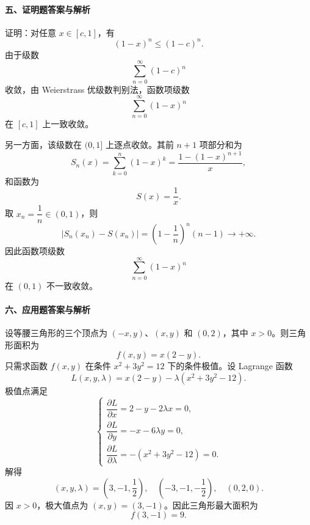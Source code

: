 \paragraph*{五、证明题答案与解析}
证明：对任意 $x\in[c,1]$，有
\[
  (1-x)^n\le (1-c)^n.
\]
由于级数
\[
  \sum_{n=0}^{\infty}(1-c)^n
\]
收敛，由 Weierstrass 优级数判别法，函数项级数
\[
  \sum_{n=0}^{\infty}(1-x)^n
\]
在 $[c,1]$ 上一致收敛。

另一方面，该级数在 $(0,1]$ 上逐点收敛。其前 $n+1$ 项部分和为
\[
  S_n(x)=\sum_{k=0}^{n}(1-x)^k
  =\frac{1-(1-x)^{n+1}}{x},
\]
和函数为
\[
  S(x)=\frac1x.
\]
取 $x_n=\dfrac1n\in(0,1)$，则
\[
  \left|S_n(x_n)-S(x_n)\right|
  =\left(1-\frac1n\right)^n(n-1)\to+\infty.
\]
因此函数项级数
\[
  \sum_{n=0}^{\infty}(1-x)^n
\]
在 $(0,1)$ 不一致收敛。

\paragraph*{六、应用题答案与解析}
设等腰三角形的三个顶点为 $(-x,y)$、$(x,y)$ 和 $(0,2)$，其中 $x>0$。则三角形面积为
\[
  f(x,y)=x(2-y).
\]
只需求函数 $f(x,y)$ 在条件 $x^2+3y^2=12$ 下的条件极值。设 Lagrange 函数
\[
  L(x,y,\lambda)=x(2-y)-\lambda(x^2+3y^2-12).
\]
极值点满足
\[
  \begin{cases}
    \dfrac{\partial L}{\partial x}=2-y-2\lambda x=0,\\
    \dfrac{\partial L}{\partial y}=-x-6\lambda y=0,\\
    \dfrac{\partial L}{\partial \lambda}=-(x^2+3y^2-12)=0.
  \end{cases}
\]
解得
\[
  (x,y,\lambda)=\left(3,-1,\frac12\right),\quad
  \left(-3,-1,-\frac12\right),\quad
  (0,2,0).
\]
因 $x>0$，极大值点为 $(x,y)=(3,-1)$。因此三角形最大面积为
\[
  f(3,-1)=9.
\]
